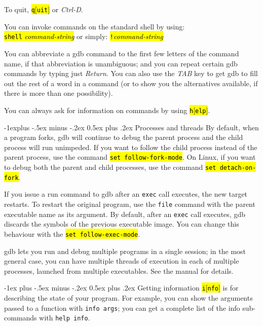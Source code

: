 \documentclass[a4paper,landscape]{article}
\makeatletter
\renewcommand{\section}{\@startsection{section}{1}{0mm}%
                                {-1ex plus -.5ex minus -.2ex}%
                                {0.5ex plus .2ex}%
                                {\normalfont\large\bfseries}}
\renewcommand{\subsection}{\@startsection{subsection}{2}{0mm}%
                                {-1explus -.5ex minus -.2ex}%
                                {0.5ex plus .2ex}%
                                {\normalfont\normalsize\bfseries}}
\makeatother
\begin{document}
\begin{multicols*}{3}
To quit, \hl{\texttt{q}[\texttt{uit}]} or \textit{Ctrl-D}.

You can invoke commands on the standard shell by using:\\
\hl{\texttt{shell}\textit{ command-string}}
or simply: \hl{\texttt{!}\textit{command-string}}

You can abbreviate a gdb command to the first few letters of the command name, if that
abbreviation is unambiguous; and you can repeat certain gdb commands by typing just
\textit{Return}. You can also use the \textit{TAB} key to get gdb to fill out the rest of a word in a command (or to show you the alternatives available, if there is more than one possibility).

You can always ask for information on commands by using \hl{\texttt{h}[\texttt{elp}]}.

\subsection{Processes and threads}
By default, when a program forks, gdb will continue to debug the parent process and
the child process will run unimpeded.
If you want to follow the child process instead of the parent process, use the command
\hl{\texttt{set follow-fork-mode}}.
On Linux, if you want to debug both the parent and child processes, use the command
\hl{\texttt{set detach-on-fork}}.

If you issue a run command to gdb after an \texttt{exec} call executes, the new target restarts.
To restart the original program, use the \texttt{file} command with the parent executable name
as its argument. By default, after an \texttt{exec} call executes, gdb discards the symbols of the
previous executable image. You can change this behaviour with the \hl{\texttt{set follow-exec-mode}}.

gdb lets you run and debug multiple programs in a single session;
in the most general case, you can have multiple threads
of execution in each of multiple processes, launched from multiple executables.
See the manual for details.

\section{Getting information}
\hl{\texttt{i}[\texttt{nfo}]} is for describing the state of your program. For
example, you can show the arguments passed to a function with \texttt{info args};
you can get a complete list of the info sub-commands with \texttt{help info}.


\end{multicols*}
\end{document}
